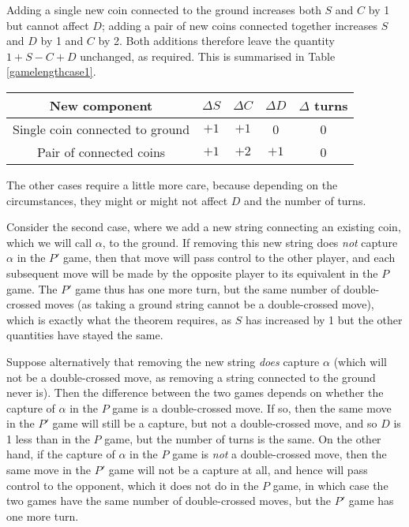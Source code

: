 \documentclass[a4paper,twocolumn]{article}
\begin{document}
Adding a single new coin connected to the ground increases both $S$
and $C$ by 1 but cannot affect $D$; adding a pair of new coins
connected together increases $S$ and $D$ by 1 and $C$ by 2. Both
additions therefore leave the quantity $1+S-C+D$ unchanged, as
required. This is summarised in Table \ref{gamelengthcase1}.

\begin{table*}[p]
  \centering
  \begin{tabular}{c c c c c}
    New component & $\Delta S$ & $\Delta C$ & $\Delta D$ & $\Delta$
    turns \\
    \hline
    Single coin connected to ground & $+1$ & $+1$ & 0 & 0 \\
    Pair of connected coins & $+1$ & $+2$ & $+1$ & 0
  \end{tabular}
  \caption{New independent component with a single string}
  \label{gamelengthcase1}
\end{table*}

The other cases require a little more care, because depending on the
circumstances, they might or might not affect $D$ and the number of
turns.

Consider the second case, where we add a new string connecting an
existing coin, which we will call $\alpha$, to the ground. If removing
this new string does \emph{not} capture $\alpha$ in the $P'$ game,
then that move will pass control to the other player, and each
subsequent move will be made by the opposite player to its equivalent
in the $P$ game. The $P'$ game thus has one more turn, but the same
number of double-crossed moves (as taking a ground string cannot be a
double-crossed move), which is exactly what the theorem requires, as
$S$ has increased by 1 but the other quantities have stayed the same.

Suppose alternatively that removing the new string \emph{does} capture
$\alpha$ (which will not be a double-crossed move, as removing a
string connected to the ground never is). Then the difference between
the two games depends on whether the capture of $\alpha$ in the $P$
game is a double-crossed move. If so, then the same move in the $P'$
game will still be a capture, but not a double-crossed move, and so
$D$ is 1 less than in the $P$ game, but the number of turns is the
same. On the other hand, if the capture of $\alpha$ in the $P$ game is
\emph{not} a double-crossed move, then the same move in the $P'$ game
will not be a capture at all, and hence will pass control to the
opponent, which it does not do in the $P$ game, in which case the two
games have the same number of double-crossed moves, but the $P'$ game
has one more turn.
\end{document}
